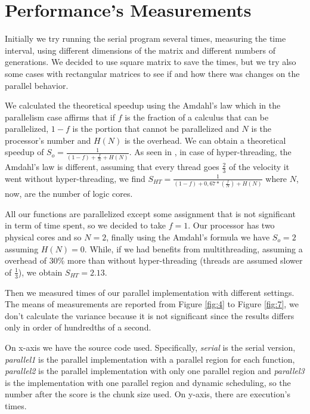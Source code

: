 \documentclass[a4paper,11pt,twoside]{report}
\begin{document}
\chapter{Performance's Measurements}\label{am}
\noindent Initially we try running the serial program several times, measuring the time interval, using different dimensions of the matrix and different numbers of generations.
We decided to use square matrix to save the times, but we try also some cases with rectangular matrices to see if and how there was changes on the parallel behavior.

\noindent We calculated the theoretical speedup using the Amdahl's law which in the parallelism case affirms that if $f$ is the fraction of a calculus that can be parallelized, $1-f$ is the portion that cannot be parallelized and $N$ is the processor's number and $H(N)$ is the overhead. We can obtain a theoretical speedup of $S_{o} = \frac{1}{(1-f) + \frac{f}{N} + H(N)}$. As seen in \cite{multi}, in case of hyper-threading, the Amdahl's law is different, assuming that every thread goes $\frac{2}{3}$ of the velocity it went without hyper-threading, we find $S_{HT} = \frac{1}{(1-f) + 0,67*(\frac{f}{N}) + H(N)}$ where $N$, now, are the number of logic cores.

\noindent All our functions are parallelized except some assignment that is not significant in term of time spent, so we decided to take $f = 1$. Our processor has two physical cores and so $N =2$, finally using the Amdahl's formula we have $S_o = 2$ assuming $H(N) =0$. While, if we had benefits from multithreading, assuming a overhead of 30\% more than without hyper-threading (threads are assumed slower of $\frac{1}{3}$), we obtain $S_{HT} = 2.13$.

\noindent Then we measured times of our parallel implementation with different settings. The means of measurements are reported from Figure \ref{fig:4} to Figure \ref{fig:7}, we don't calculate the variance because it is not significant since the results differs only in order of hundredths of a second.

\noindent On x-axis we have the source code used. Specifically, \emph{serial} is the serial version, \emph{parallel1} is the parallel implementation with a parallel region for each function, \emph{parallel2} is the parallel implementation with only one parallel region and \emph{parallel3} is the implementation with one parallel region and dynamic scheduling, so the number after the score is the chunk size used. On y-axis, there are execution's times.
\end{document}
